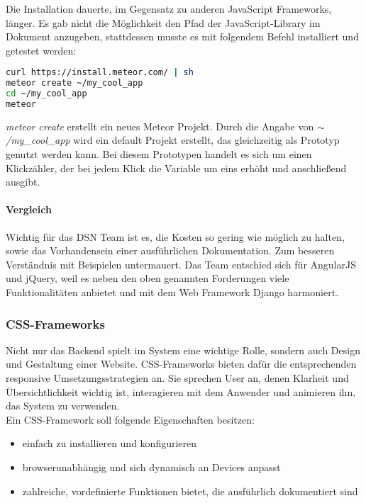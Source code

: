 Die Installation dauerte, im Gegensatz zu anderen JavaScript Frameworks, länger. Es gab nicht die Möglichkeit den Pfad der JavaScript-Library im Dokument anzugeben, stattdessen musste es mit folgendem Befehl installiert und getestet werden:
\begin{lstlisting}[caption={Installation von Meteor \cite{METEORINSTALL}}, language=bash]
curl https://install.meteor.com/ | sh
meteor create ~/my_cool_app
cd ~/my_cool_app
meteor
\end{lstlisting}

\textit{meteor create} erstellt ein neues Meteor Projekt. Durch die Angabe von \textit{$\sim$/my\_cool\_app} wird ein default Projekt erstellt, das gleichzeitig als Prototyp genutzt werden kann. Bei diesem Prototypen handelt es sich um einen Klickzähler, der bei jedem Klick die Variable um eins erhöht und anschließend ausgibt.

\newpage

\paragraph{Vergleich}
Wichtig für das DSN Team ist es, die Kosten so gering wie möglich zu halten, sowie das Vorhandensein einer ausführlichen Dokumentation. Zum besseren Verständnis mit Beispielen untermauert. Das Team entschied sich für AngularJS und jQuery, weil es neben den oben genannten Forderungen viele Funktionalitäten anbietet und mit dem Web Framework Django harmoniert.

\subsubsection{CSS-Frameworks}
Nicht nur das Backend spielt im System eine wichtige Rolle, sondern auch Design und Gestaltung einer Website. CSS-Frameworks bieten dafür die entsprechenden responsive Umsetzungsstrategien an. Sie sprechen User an, denen Klarheit und Übersichtlichkeit wichtig ist, interagieren mit dem Anwender und animieren ihn, das System zu verwenden. \\
Ein CSS-Framework soll folgende Eigenschaften besitzen:
\begin{itemize}
\item einfach zu installieren und konfigurieren
\item browserunabhängig und sich dynamisch an Devices anpasst
\item zahlreiche, vordefinierte Funktionen bietet, die ausführlich dokumentiert sind
\end{itemize} \cite{CSS}

